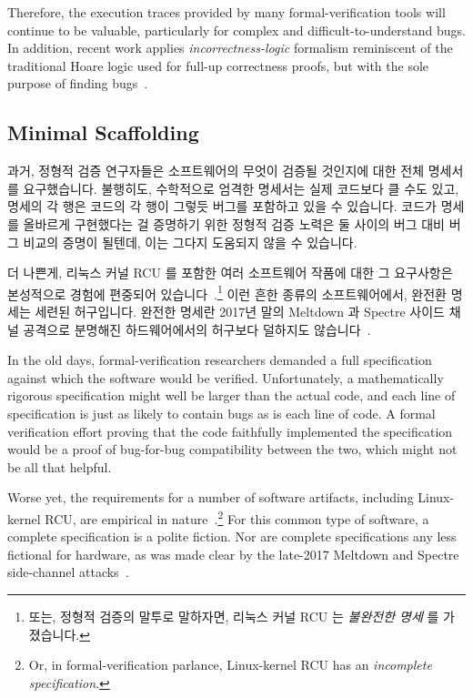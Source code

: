 Therefore, the execution traces provided
by many formal-verification tools will continue to be valuable,
particularly for complex and difficult-to-understand bugs.
In addition, recent work applies \emph{incorrectness-logic}
formalism reminiscent of the traditional Hoare logic used for
full-up correctness proofs, but with the sole purpose of finding
bugs~\cite{PeterWOHearn2019incorrectnessLogic}.

\fi

\subsection{Minimal Scaffolding}
\label{sec:future:Minimal Scaffolding}

과거, 정형적 검증 연구자들은 소프트웨어의 무엇이 검증될 것인지에 대한 전체
명세서를 요구했습니다.
불행히도, 수학적으로 엄격한 명세서는 실제 코드보다 클 수도 있고, 명세의 각 행은
코드의 각 행이 그렇듯 버그를 포함하고 있을 수 있습니다.
코드가 명세를 올바르게 구현했다는 걸 증명하기 위한 정형적 검증 노력은 둘 사이의
버그 대비 버그 비교의 증명이 될텐데, 이는 그다지 도움되지 않을 수 있습니다.

더 나쁜게, 리눅스 커널 RCU 를 포함한 여러 소프트웨어 작품에 대한 그 요구사항은
본성적으로 경험에 편중되어
있습니다~\cite{PaulEMcKenney2015RCUreqts1,PaulEMcKenney2015RCUreqts2,PaulEMcKenney2015RCUreqts3}.\footnote{
	또는, 정형적 검증의 말투로 말하자면, 리눅스 커널 RCU 는 \emph{불완전한
	명세} 를 가졌습니다.}
이런 흔한 종류의 소프트웨어에서, 완전환 명세는 세련된 허구입니다.
완전한 명세란 2017년 말의 Meltdown 과 Spectre 사이드 채널 공격으로
분명해진 하드웨어에서의 허구보다 덜하지도
않습니다~\cite{JannHorn2018MeltdownSpectre}.

\iffalse

In the old days, formal-verification researchers demanded a full
specification against which the software would be verified.
Unfortunately, a mathematically rigorous specification might well
be larger than the actual code, and each line of specification
is just as likely to contain bugs as is each line of code.
A formal verification effort proving that the code faithfully implemented
the specification would be a proof of bug-for-bug compatibility between
the two, which might not be all that helpful.

Worse yet, the requirements for a number of software artifacts,
including Linux-kernel RCU, are empirical in
nature~\cite{PaulEMcKenney2015RCUreqts1,PaulEMcKenney2015RCUreqts2,PaulEMcKenney2015RCUreqts3}.\footnote{
	Or, in formal-verification parlance, Linux-kernel RCU has an
	\emph{incomplete specification}.}
For this common type of software, a complete specification is a
polite fiction.
Nor are complete specifications any less fictional for hardware,
as was made clear by the late-2017 Meltdown and Spectre side-channel
attacks~\cite{JannHorn2018MeltdownSpectre}.

